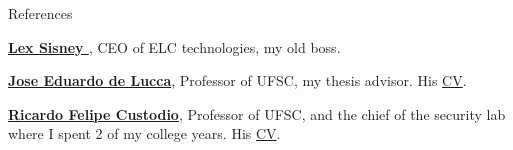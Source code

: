\begin{rubric}{References}

    \entry* \textbf{\href{mailto:lsisney@elctech.com}{Lex Sisney }}, 
    CEO of ELC technologies, my old boss. 

    \entry* \textbf{\href{mailto:delucca@inf.ufsc.br}{Jose Eduardo de Lucca}}, 
    Professor of  UFSC, my thesis advisor. His
    \href{http://buscatextual.cnpq.br/buscatextual/visualizacv.jsp?id=K4790322A6\&idiomaExibicao=2}{CV}.   

    \entry* \textbf{\href{mailto:custodio@inf.ufsc.br}{Ricardo Felipe Custodio}}, 
    Professor of UFSC, and the chief of the security lab where I spent 2 of my
    college years. His 
    \href{http://buscatextual.cnpq.br/buscatextual/visualizacv.jsp?id=K4788588H7}{CV}.   

\end{rubric}
